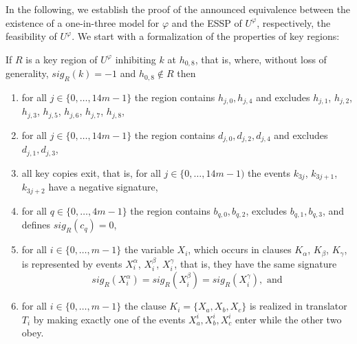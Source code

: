 \documentclass[english]{lipics_hacked}
\begin{document}
In the following, we establish the proof of the announced equivalence between the existence of a one-in-three model for $\varphi$ and the ESSP of $U^\varphi$, respectively, the feasibility of $U^\varphi$.
We start with a formalization of the properties of key regions:
%
\begin{lemma}
\label{lem:key_region_2-grade_2-fold_ESSP_Feasibility}
If $R$ is a key region of $U^\varphi$ inhibiting $k$ at $h_{0,8}$, that is, where, without loss of generality, $sig_{R}(k) = -1$ and $h_{0,8} \not\in R$ then
%
\begin{enumerate}
%
\item\label{lem:key_region_2-grade_2-fold_ESSP_Feasibility:item1}
for all $j \in \{0, \dots, 14m-1\}$ the region contains $h_{j,0}, h_{j,4}$ and excludes $h_{j,1}$, $h_{j,2}$, $h_{j,3}$, $h_{j,5}$, $h_{j,6}$, $h_{j,7}$, $h_{j,8}$,
%
\item\label{lem:key_region_2-grade_2-fold_ESSP_Feasibility:item2}
for all $j \in \{0, \dots, 14m-1\}$ the region contains $d_{j,0}, d_{j,2}, d_{j,4}$ and excludes $d_{j,1}, d_{j,3}$,
%
\item\label{lem:key_region_2-grade_2-fold_ESSP_Feasibility:item3}
all key copies exit, that is, for all $j \in \{0, \dots, 14m-1)$ the events $k_{3j}$, $k_{3j+1}$, $k_{3j+2}$ have a negative signature,
%
\item\label{lem:key_region_2-grade_2-fold_ESSP_Feasibility:item4}
for all $q \in \{0, \dots, 4m-1\}$ the region contains $b_{q,0}, b_{q,2}$, excludes $b_{q,1}, b_{q,3}$, and defines $sig_{R}(c_q) = 0$,
%
\item\label{lem:key_region_2-grade_2-fold_ESSP_Feasibility:item5}
for all $i \in \{0, \dots, m-1\}$ the variable $X_i$, which occurs in clauses $K_\alpha$, $K_\beta$, $K_\gamma$, is represented by events $X^\alpha_i$, $X^\beta_i$, $X^\gamma_i$, that is, they have the same signature
%
\[sig_{R}(X^\alpha_i) = sig_{R}(X^\beta_i) = sig_{R}(X^\gamma_i), \text{ and}\]
%
\item\label{lem:key_region_2-grade_2-fold_ESSP_Feasibility:item6}
for all $i \in \{0, \dots, m-1\}$ the clause $K_i = \{X_a, X_b, X_c\}$ is realized in translator $T_i$ by making exactly one of the events $X^i_a, X^i_b, X^i_c$ enter while the other two obey. 
%
\end{enumerate}
%
\end{lemma}
%
\end{document}

